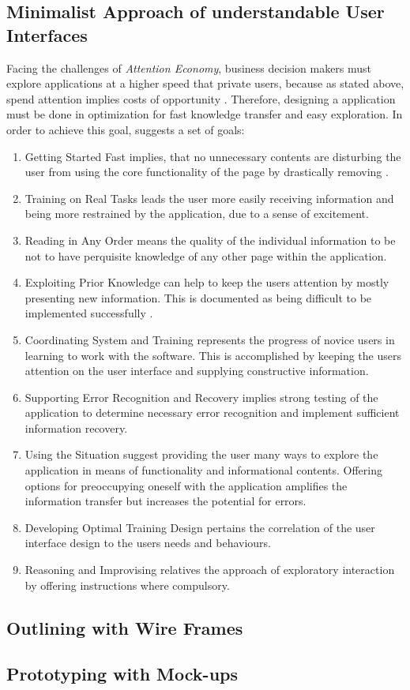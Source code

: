 \subsection{Minimalist Approach of understandable User Interfaces}
Facing the challenges of \textit{Attention Economy}, business decision makers must explore applications at a higher speed that private users, because as stated above, spend attention implies costs of opportunity \parencite[cf.][]{Bakar.2017}. Therefore, designing a application must be done in optimization for fast knowledge transfer and easy exploration. In order to achieve this goal, \textcite{Bakar.2017} suggests a set of goals:
\begin{enumerate}
\item{Getting Started Fast} implies, that no unnecessary contents are disturbing the user from using the core functionality of the page by drastically removing   \parencite{Bakar.2017}.
\item{Training on Real Tasks} leads the user more easily receiving information and being more restrained by the application, due to a sense of excitement.
\item{Reading in Any Order} means the quality of the individual information to be not to have perquisite knowledge of any other page within the application.
\item{Exploiting Prior Knowledge} can help to keep the users attention by mostly presenting new information. This is documented as being difficult to be implemented successfully .
\item{Coordinating System and Training} represents the progress of novice users in learning to work with the software. This is accomplished by keeping the users attention on the user interface and supplying constructive information.
\item{Supporting Error Recognition and Recovery} implies strong testing of the application to determine necessary error recognition and implement sufficient information recovery.
\item{Using the Situation} suggest providing the user many ways to explore the application in means of functionality and informational contents. Offering options for preoccupying oneself with the application amplifies the information transfer but increases the potential for errors.
\item{Developing Optimal Training Design} pertains the correlation of the user interface design to the users needs and behaviours. 
\item{Reasoning and Improvising} relatives the approach of exploratory interaction by offering instructions where compulsory.
\end{enumerate}


\subsection{Outlining with Wire Frames}


\subsection{Prototyping with Mock-ups}